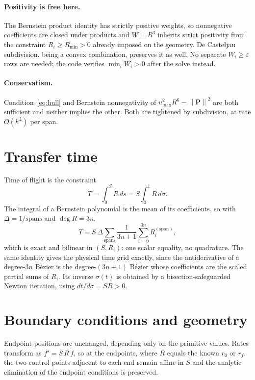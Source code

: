 \documentclass[11pt]{article}
\newcommand{\umax}{u_{\max}}
\newcommand{\norm}[1]{\left\lVert #1\right\rVert}
\begin{document}
\paragraph{Positivity is free here.} The Bernstein product identity has strictly
positive weights, so nonnegative coefficients are closed under products and
$W=R^3$ inherits strict positivity from the constraint $R_i\ge R_{\min}>0$
already imposed on the geometry. De Casteljau subdivision, being a convex
combination, preserves it as well. No separate $W_i\ge\varepsilon$ rows are
needed; the code verifies $\min_i W_i>0$ after the solve instead.

\paragraph{Conservatism.} Condition~\eqref{eq:hull} and Bernstein nonnegativity
of $\umax^2R^6-\norm{\mathbf P}^2$ are both sufficient and neither implies the
other. Both are tightened by subdivision, at rate $O(h^2)$ per span.

\section{Transfer time}

Time of flight is the constraint
\begin{equation}
  T = \int_0^S R\,ds = S\int_0^1 R\,d\sigma .
\end{equation}
The integral of a Bernstein polynomial is the mean of its coefficients, so with
$\Delta=1/\text{spans}$ and $\deg R = 3n$,
\begin{equation}
  T = S\,\Delta\sum_{\text{spans}}\frac{1}{3n+1}\sum_{i=0}^{3n} R_i^{(\text{span})},
\end{equation}
which is exact and bilinear in $(S,R_i)$: one scalar equality, no quadrature.
The same identity gives the physical time grid exactly, since the antiderivative
of a degree-$3n$ B\'ezier is the degree-$(3n{+}1)$ B\'ezier whose coefficients
are the scaled partial sums of $R_i$. Its inverse $\sigma(t)$ is obtained by a
bisection-safeguarded Newton iteration, using $dt/d\sigma = SR>0$.

\section{Boundary conditions and geometry}
\label{sec:geometry}

Endpoint positions are unchanged, depending only on the primitive values. Rates
transform as $f' = S\,R\,\dot f$, so at the endpoints, where $R$ equals the known
$r_0$ or $r_f$, the two control points adjacent to each end remain affine in $S$
and the analytic elimination of the endpoint conditions is preserved.
\end{document}
